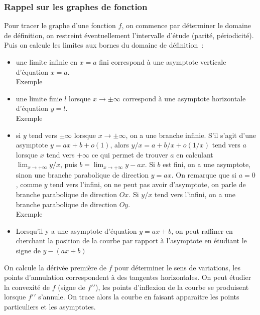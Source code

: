 \documentclass[a4paper,11pt]{article}
\begin{document}
\begin{giacjshere}
\subsubsection{Rappel sur les graphes de fonction}
Pour tracer le graphe d'une fonction $f$, on commence par
d\'eterminer le domaine de
d\'efinition, on restreint \'eventuellement l'intervalle d'\'etude
(parit\'e, p\'eriodicit\'e). Puis on calcule les limites aux bornes
du domaine de d\'efinition~:
\begin{itemize}
\item une limite infinie en $x=a$ fini correspond \`a une asymptote
verticale d'\'equation $x=a$.\\
Exemple 
\item une limite finie $l$ lorsque $x\rightarrow \pm \infty$ correspond
\`a une asymptote horizontale d'\'equation $y=l$.\\
Exemple 
\item si $y$ tend vers $\pm \infty$ lorsque $x\rightarrow \pm \infty$,
on a une branche infinie. S'il s'agit d'une asymptote $y=ax+b+o(1)$, alors
$y/x=a+b/x+o(1/x)$ tend vers $a$ lorsque $x$ tend vers $+\infty$ ce qui
permet de trouver $a$ en calculant $\lim_{x\rightarrow +\infty} y/x$,
puis $b=\lim_{x\rightarrow +\infty}y-ax$. Si $b$ est fini, on a une
asymptote, sinon une branche parabolique de direction $y=ax$. 
On remarque que si $a=0$,
comme $y$ tend vers l'infini, on ne peut pas avoir d'asymptote, on
parle de branche parabolique de direction $Ox$. Si $y/x$ tend vers
l'infini, on a une branche parabolique de direction $Oy$.\\
Exemple 
\item Lorsqu'il y a une asymptote d'\'equation $y=ax+b$, 
on peut raffiner en cherchant la
position de la courbe par rapport \`a l'asymptote en \'etudiant le
signe de $y-(ax+b)$
\end{itemize}
On calcule la d\'eriv\'ee premi\`ere de $f$ pour d\'eterminer le sens
de variations, les points d'annulation correspondent \`a des tangentes
horizontales. On peut \'etudier la convexit\'e de $f$ (signe de
$f'{'}$), les points d'inflexion de la courbe se produisent lorsque
$f'{'}$ s'annule.
On trace alors la courbe en faisant apparaitre les points particuliers
et les asymptotes.


\end{giacjshere}
\end{document}
